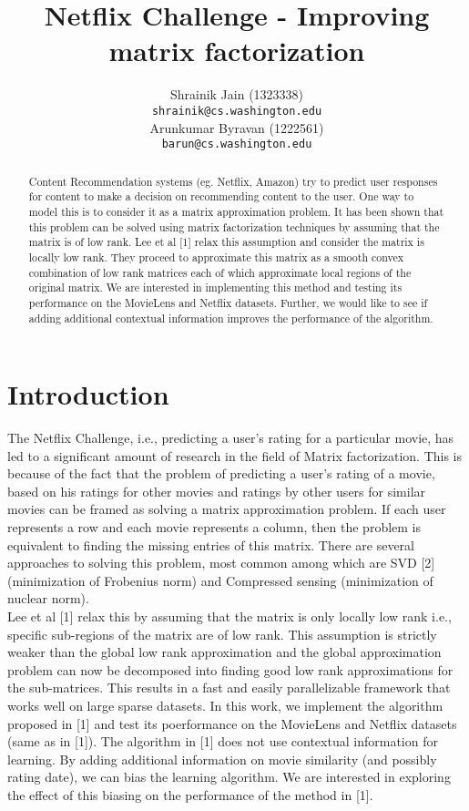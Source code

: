\documentclass{article} %
\title{Netflix Challenge - Improving matrix factorization}
\author{
Shrainik Jain (1323338)\\
\texttt{shrainik@cs.washington.edu} \\
\And
Arunkumar Byravan (1222561) \\
\texttt{barun@cs.washington.edu} \\
}
\begin{document}
\maketitle

\begin{abstract}
Content Recommendation systems (eg. Netflix, Amazon) try to predict user responses for content to make a decision on recommending content to the user. One way to model this is to consider it as a matrix approximation problem. It has been shown that this problem can be solved using matrix factorization techniques by assuming that the matrix is of low rank. Lee et al [1] relax this assumption and consider the matrix is locally low rank. They proceed to approximate this matrix as a smooth convex combination of low rank matrices each of which approximate local regions of the original matrix. We are interested in implementing this method and testing its performance on the MovieLens and Netflix datasets. Further, we would like to see if adding additional contextual information improves the performance of the algorithm.
\end{abstract}

\section{Introduction}
The Netflix Challenge, i.e., predicting a user's rating for a particular movie, has led to a significant amount of research in the field of Matrix factorization. This is because of the fact that the problem of predicting a user's rating of a movie, based on his ratings for other movies and ratings by other users for similar movies can be framed as solving a matrix approximation problem. If each user represents a row and each movie represents a column, then the problem is equivalent to finding the missing entries of this matrix. There are several approaches to solving this problem, most common among which are SVD [2] (minimization of Frobenius norm) and Compressed sensing (minimization of nuclear norm). \\
Lee et al [1] relax this by assuming that the matrix is only locally low rank i.e., specific sub-regions of the matrix are of low rank. This assumption is strictly weaker than the global low rank approximation and the global approximation problem can now be decomposed into finding good low rank approximations for the sub-matrices. This results in a fast and easily parallelizable framework that works well on large sparse datasets. In this work, we implement the algorithm proposed in [1] and test its poerformance on the MovieLens and Netflix datasets (same as in [1]). The algorithm in [1] does not use contextual information for learning. By adding additional information on movie similarity (and possibly rating date), we can bias the learning algorithm. We are interested in exploring the effect of this biasing on the performance of the method in [1].
\end{document}

